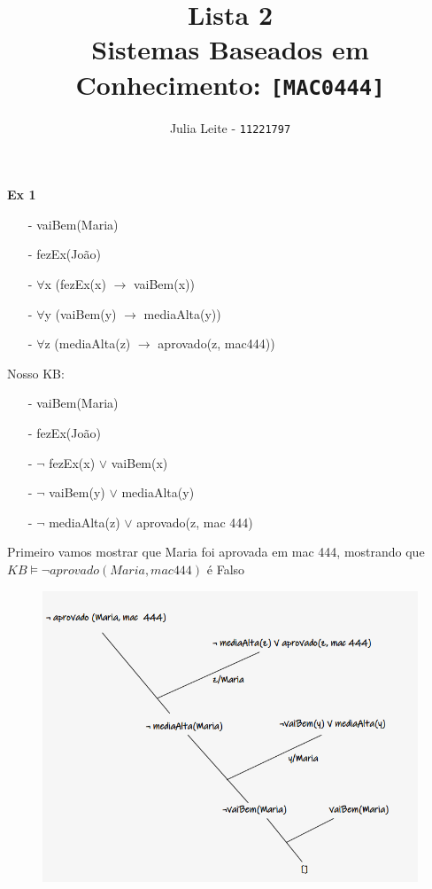 \documentclass{article}
\title{Lista 2\\
\large Sistemas Baseados em Conhecimento: \texttt{[MAC0444]}}
\author{Julia Leite - \texttt{11221797}}
\begin{document}
    \maketitle

    \textbf{Ex 1}

    \begin{itemize}
        \item [-] vaiBem(Maria)
        \item [-] fezEx(João)
        \item [-] $\forall$x (fezEx(x) $\rightarrow$ vaiBem(x))
        \item [-] $\forall$y (vaiBem(y) $\rightarrow$ mediaAlta(y))
        \item [-] $\forall$z (mediaAlta(z) $\rightarrow$ aprovado(z, mac444))
    \end{itemize}

    Nosso KB:

    \begin{itemize}
        \item [-] vaiBem(Maria)
        \item [-] fezEx(João)
        \item [-] $\neg$ fezEx(x) $\lor$ vaiBem(x)
        \item [-] $\neg$ vaiBem(y) $\lor$ mediaAlta(y)
        \item [-] $\neg$ mediaAlta(z) $\lor$ aprovado(z, mac 444)
    \end{itemize}

    Primeiro vamos mostrar que Maria foi aprovada em mac 444, mostrando que 
    $KB \vDash \neg aprovado(Maria, mac 444)$ é Falso

    \begin{figure}[H]
        \centering
        \includegraphics[width=12cm]{img/maria.png}
    \end{figure}
    
\end{document}
